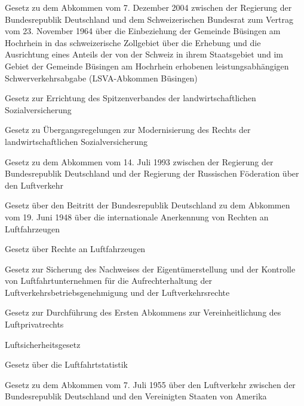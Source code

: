 \item[{LSVAAbkBüsG}] Gesetz zu dem Abkommen vom 7. Dezember 2004 zwischen der Regierung der Bundesrepublik Deutschland und dem Schweizerischen Bundesrat zum Vertrag vom 23. November 1964 über die Einbeziehung der Gemeinde Büsingen am Hochrhein in das schweizerische Zollgebiet über die Erhebung und die Ausrichtung eines Anteils der von der Schweiz in ihrem Staatsgebiet und im Gebiet der Gemeinde Büsingen am Hochrhein erhobenen leistungsabhängigen Schwerverkehrsabgabe (LSVA-Abkommen Büsingen)

\item[{LSVSpiVG}] Gesetz zur Errichtung des Spitzenverbandes der landwirtschaftlichen Sozialversicherung

\item[{LSVÜG}] Gesetz zu Übergangsregelungen zur Modernisierung des Rechts der landwirtschaftlichen Sozialversicherung

\item[{LuftAbkRussFöG}] Gesetz zu dem Abkommen vom 14. Juli 1993 zwischen der Regierung der Bundesrepublik Deutschland und der Regierung der Russischen Föderation über den Luftverkehr

\item[{LuftFzgAbkG}] Gesetz über den Beitritt der Bundesrepublik Deutschland zu dem Abkommen vom 19. Juni 1948 über die internationale Anerkennung von Rechten an Luftfahrzeugen

\item[{LuftFzgG}] Gesetz über Rechte an Luftfahrzeugen

\item[{LuftNaSiG}] Gesetz zur Sicherung des Nachweises der Eigentümerstellung und der Kontrolle von Luftfahrtunternehmen für die Aufrechterhaltung der Luftverkehrsbetriebsgenehmigung und der Luftverkehrsrechte

\item[{LuftRAAbkDG}] Gesetz zur Durchführung des Ersten Abkommens zur Vereinheitlichung des Luftprivatrechts

\item[{LuftSiG}] Luftsicherheitsgesetz

\item[{LuftStatG}] Gesetz über die Luftfahrtstatistik

\item[{LuftVerkUSAAbkG}] Gesetz zu dem Abkommen vom 7. Juli 1955 über den Luftverkehr zwischen der Bundesrepublik Deutschland und den Vereinigten Staaten von Amerika

